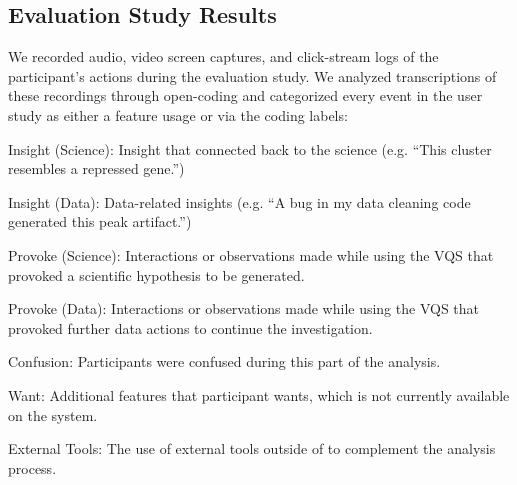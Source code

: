 \subsection{Evaluation Study Results\label{sec:eval_findings}}
We recorded audio, video screen captures, and click-stream logs of the participant's actions during the evaluation study. We analyzed transcriptions of these recordings through open-coding and categorized every event in the user study as either a feature usage or via the coding labels:
\begin{denselist}
    \item Insight (Science): Insight that connected back to the science (e.g. ``This cluster resembles a repressed gene.'')
    \item Insight (Data): Data-related insights (e.g. ``A bug in my data cleaning code generated this peak artifact.'')
    \item Provoke (Science): Interactions or observations made while using the VQS that provoked a scientific hypothesis to be generated.
    \item Provoke (Data): Interactions or observations made while using the VQS that provoked further data actions to continue the investigation.
    \item Confusion: Participants were confused during this part of the analysis.
    \item Want: Additional features that participant wants, which is not currently available on the system.
    \item External Tools: The use of external tools outside of \zv to complement the analysis process.
\end{denselist}
